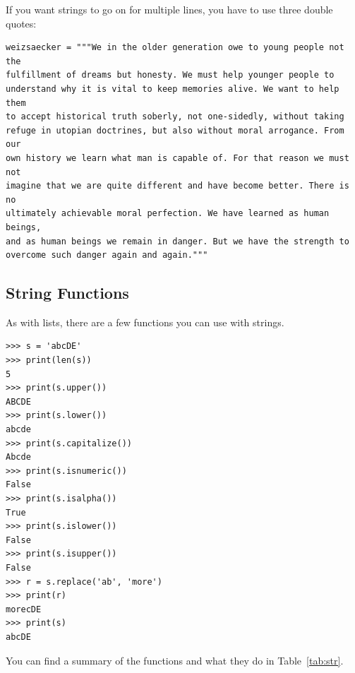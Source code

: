 \documentclass[11pt]{cselabheader}
\begin{document}
If you want strings to go on for multiple lines, you have to use three double
quotes:
\begin{lstlisting}[caption={Excerpt of Richard von Weizs\"{a}cker's speech in
the Bundestag to commemorate the 40th anniversary of the end of World War II.}]
weizsaecker = """We in the older generation owe to young people not the 
fulfillment of dreams but honesty. We must help younger people to 
understand why it is vital to keep memories alive. We want to help them 
to accept historical truth soberly, not one-sidedly, without taking 
refuge in utopian doctrines, but also without moral arrogance. From our
own history we learn what man is capable of. For that reason we must not
imagine that we are quite different and have become better. There is no
ultimately achievable moral perfection. We have learned as human beings,
and as human beings we remain in danger. But we have the strength to 
overcome such danger again and again."""
\end{lstlisting}

\subsection{String Functions}

As with lists, there are a few functions you can use with strings.

\begin{lstlisting}[style=ipython]
>>> s = 'abcDE'
>>> print(len(s))
5
>>> print(s.upper())
ABCDE
>>> print(s.lower())
abcde
>>> print(s.capitalize())
Abcde
>>> print(s.isnumeric())
False
>>> print(s.isalpha())
True
>>> print(s.islower())
False
>>> print(s.isupper())
False
>>> r = s.replace('ab', 'more')
>>> print(r)
morecDE
>>> print(s)
abcDE
\end{lstlisting}

You can find a summary of the functions and what they do in Table~\ref{tab:str}.
\end{document}

